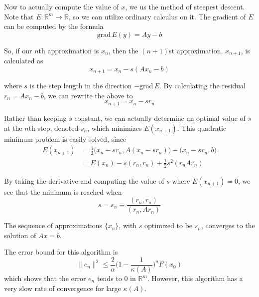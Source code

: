   Now to actually compute the value of $x$, we us the method of steepest descent. Note that $E: \mathbb{R}^m \longrightarrow \mathbb{R}$, so we can utilize ordinary calculus on it. The gradient of $E$ can be computed by the formula 
  \begin{equation}
    \text{grad}\,E(y) = A y - b
  \end{equation}

  So, if our $n$th approximation is $x_n$, then the $(n+1)$st approximation, $x_{n+1}$, is calculated as
  \begin{equation}
    x_{n+1} = x_n - s (Ax_n - b)
  \end{equation}

  where $s$ is the step length in the direction $-$grad$\,E$. By calculating the residual $r_n = A x_n - b$, we can rewrite the above to
  \begin{equation}
    x_{n+1} = x_n - s r_n
  \end{equation}

  Rather than keeping $s$ constant, we can actually determine an optimal value of $s$ at the $n$th step, denoted $s_n$, which minimizes $E(x_{n+1})$. This quadratic minimum problem is easily solved, since
  \begin{align}
    E(x_{n+1}) & = \frac{1}{2} \big(x_n - s r_n, A(x_n - s r_n) \big) - \big( x_n - s r_n, b\big) \\
    & = E(x_n) - s (r_n, r_n) + \frac{1}{2} s^2 (r_n A r_n)
  \end{align}

  By taking the derivative and computing the value of $s$ where $E (x_{n+1}) = 0$, we see that the minimum is reached when 
  \begin{equation}
    s = s_n \equiv \frac{(r_n, r_n)}{(r_n, A r_n)}
  \end{equation}

  \begin{theorem}
    The sequence of approximations $\{x_n\}$, with $s$ optimized to be $s_n$, converges to the solution of $A x = b$. 
  \end{theorem}

  The error bound for this algorithm is 
  \begin{equation}
    \|e_n\|^2 \leq \frac{2}{\alpha} \bigg( 1-\frac{1}{\kappa(A)} \bigg)^n F(x_0)
  \end{equation}
  which shows that the error $e_n$ tends to $0$ in $\mathbb{R}^m$. However, this algorithm has a very slow rate of convergence for large $\kappa(A)$. 

